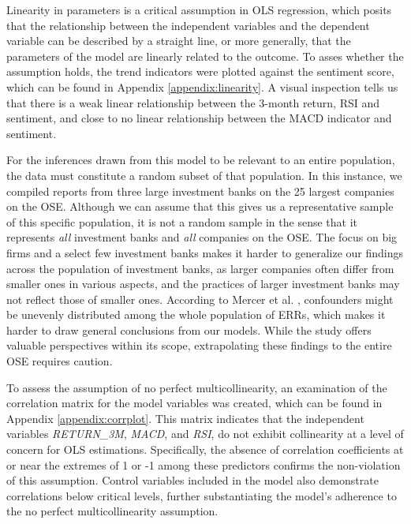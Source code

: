 Linearity in parameters is a critical assumption in OLS regression, which posits that the relationship between the independent variables and the dependent variable can be described by a straight line, or more generally, that the parameters of the model are linearly related to the outcome. To asses whether the assumption holds, the trend indicators were plotted against the sentiment score, which can be found in Appendix \ref{appendix:linearity}. A visual inspection tells us that there is a weak linear relationship between the 3-month return, RSI and sentiment, and close to no linear relationship between the MACD indicator and sentiment. 


For the inferences drawn from this model to be relevant to an entire population, the data must constitute a random subset of that population. In this instance, we compiled reports from three large investment banks on the 25 largest companies on the OSE. Although we can assume that this gives us a representative sample of this specific population, it is not a random sample in the sense that it represents \textit{all} investment banks and \textit{all} companies on the OSE. The focus on big firms and a select few investment banks  makes it harder to generalize our findings across the population of investment banks, as larger companies often differ from smaller ones in various aspects, and the practices of larger investment banks may not reflect those of smaller ones. According to Mercer et al. \parencite*{mercerprob2017}, confounders might be unevenly distributed among the whole population of ERRs, which makes it harder to draw general conclusions from our models. While the study offers valuable perspectives within its scope, extrapolating these findings to the entire OSE requires caution.

To assess the assumption of no perfect multicollinearity, an examination of the correlation matrix for the model variables was created, which can be found in Appendix \ref{appendix:corrplot}. This matrix indicates that the independent variables \textit{RETURN\_3M}, \textit{MACD}, and \textit{RSI}, do not exhibit collinearity at a level of concern for OLS estimations. Specifically, the absence of correlation coefficients at or near the extremes of 1 or -1 among these predictors confirms the non-violation of this assumption. Control variables included in the model also demonstrate correlations below critical levels, further substantiating the model's adherence to the no perfect multicollinearity assumption.

